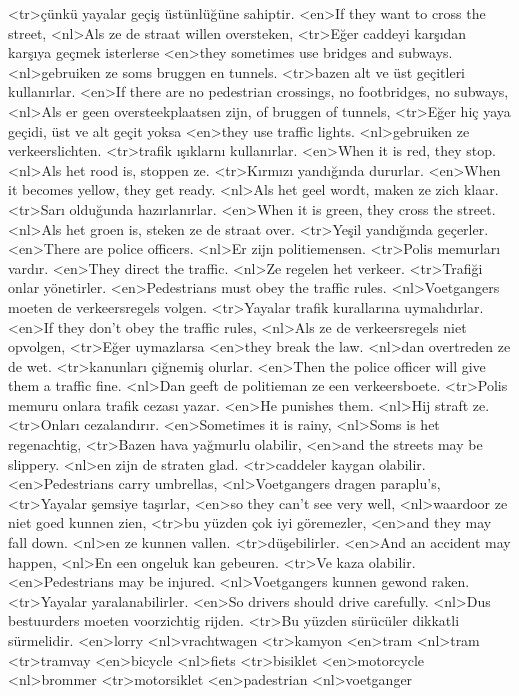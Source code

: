 <tr>çünkü yayalar geçiş üstünlüğüne sahiptir.
<en>If they want to cross the street,
<nl>Als ze de straat willen oversteken,
<tr>Eğer caddeyi karşıdan karşıya geçmek isterlerse
<en>they sometimes use bridges and subways.
<nl>gebruiken ze soms bruggen en tunnels.
<tr>bazen alt ve üst geçitleri kullanırlar.
<en>If there are no pedestrian crossings, no footbridges, no subways,
<nl>Als er geen oversteekplaatsen zijn, of bruggen of tunnels,
<tr>Eğer hiç yaya geçidi, üst ve alt geçit yoksa
<en>they use traffic lights.
<nl>gebruiken ze verkeerslichten.
<tr>trafik ışıklarnı kullanırlar.
<en>When it is red, they stop.
<nl>Als het rood is, stoppen ze.
<tr>Kırmızı yandığında dururlar.
<en>When it becomes yellow, they get ready.
<nl>Als het geel wordt, maken ze zich klaar.
<tr>Sarı olduğunda hazırlanırlar.
<en>When it is green, they cross the street.
<nl>Als het groen is, steken ze de straat over.
<tr>Yeşil yandığında geçerler.
<en>There are police officers.
<nl>Er zijn politiemensen.
<tr>Polis memurları vardır.
<en>They direct the traffic.
<nl>Ze regelen het verkeer.
<tr>Trafiği onlar yönetirler.
<en>Pedestrians  must obey the traffic rules.
<nl>Voetgangers moeten de verkeersregels volgen.
<tr>Yayalar trafik kurallarına uymalıdırlar.
<en>If they don’t obey the traffic rules,
<nl>Als ze de verkeersregels niet opvolgen,
<tr>Eğer uymazlarsa
<en>they break the law.
<nl>dan overtreden ze de wet.
<tr>kanunları çiğnemiş olurlar.
<en>Then the police officer will give them a traffic fine.
<nl>Dan geeft de politieman ze een verkeersboete.
<tr>Polis memuru onlara trafik cezası yazar.
<en>He punishes them.
<nl>Hij straft ze.
<tr>Onları cezalandırır.
<en>Sometimes it is rainy,
<nl>Soms is het regenachtig,
<tr>Bazen hava yağmurlu olabilir,
<en>and the streets may be slippery.
<nl>en zijn de straten glad.
<tr>caddeler kaygan olabilir.
<en>Pedestrians carry umbrellas,
<nl>Voetgangers dragen  paraplu's,
<tr>Yayalar şemsiye taşırlar,
<en>so they can’t see very well,
<nl>waardoor ze niet goed kunnen zien,
<tr>bu yüzden çok iyi göremezler,
<en>and they may fall down.
<nl>en ze kunnen vallen.
<tr>düşebilirler.
<en>And an accident may happen,
<nl>En een ongeluk kan gebeuren.
<tr>Ve kaza olabilir.
<en>Pedestrians may be injured.
<nl>Voetgangers kunnen gewond raken.
<tr>Yayalar yaralanabilirler.
<en>So drivers should drive carefully.
<nl>Dus bestuurders moeten voorzichtig rijden.
<tr>Bu yüzden sürücüler dikkatli sürmelidir.
<en>lorry
<nl>vrachtwagen
<tr>kamyon
<en>tram
<nl>tram
<tr>tramvay
<en>bicycle
<nl>fiets
<tr>bisiklet
<en>motorcycle
<nl>brommer
<tr>motorsiklet
<en>padestrian
<nl>voetganger
